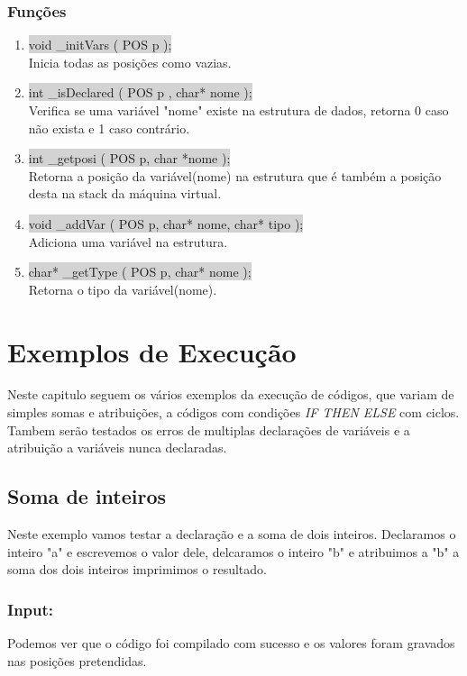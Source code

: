 \documentclass{report}
\begin{document}
\subsection{Funções}
\begin{enumerate}
\item \colorbox{lightgray}{void \_initVars ( POS p );}\\
Inicia todas as posições como vazias.
\item \colorbox{lightgray}{int \_isDeclared ( POS p , char* nome );}\\
Verifica se uma variável "nome" existe na estrutura de dados, retorna 0 caso não exista e 1 caso contrário.
\item \colorbox{lightgray}{int \_getposi ( POS p, char *nome );}\\
Retorna a posição da variável(nome) na estrutura que é também a posição desta na stack da máquina virtual.
\item \colorbox{lightgray}{void \_addVar ( POS p, char* nome, char* tipo );}\\
Adiciona uma variável na estrutura.
\item \colorbox{lightgray}{char* \_getType ( POS p, char* nome );}\\
Retorna o tipo da variável(nome).

\end{enumerate}

\chapter{Exemplos de Execução}
Neste capitulo seguem os vários exemplos da execução de códigos, que variam de simples somas e atribuições, a códigos com condições \textit{IF THEN ELSE} com ciclos. Tambem serão testados os erros de multiplas declarações de variáveis e a atribuição a variáveis nunca declaradas.

\section{Soma de inteiros}
Neste exemplo vamos testar a declaração e a soma de dois inteiros. Declaramos o inteiro "a" e escrevemos o valor dele, delcaramos o inteiro "b" e atribuimos a "b" a soma dos dois inteiros imprimimos o resultado.
\subsection{Input:}
Podemos ver que o código foi compilado com sucesso e os valores foram gravados nas posições pretendidas.
\end{document}
